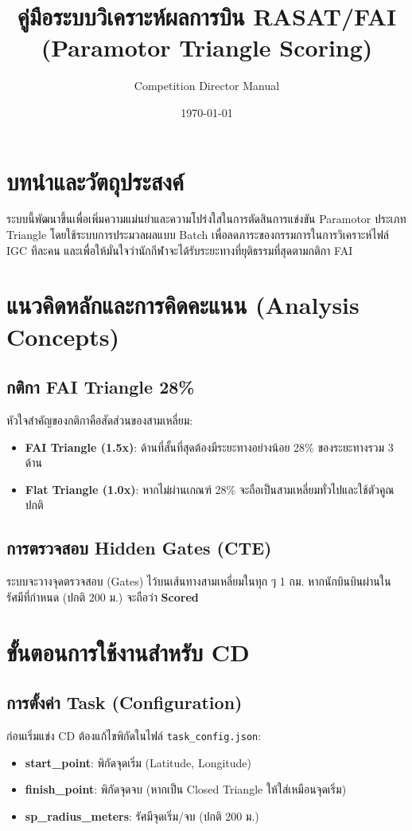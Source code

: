 \documentclass[14pt, a4paper]{extarticle} %
\title{\textbf{คู่มือระบบวิเคราะห์ผลการบิน RASAT/FAI \\ (Paramotor Triangle Scoring)}}
\author{Competition Director Manual}
\date{\today}
\begin{document}
\maketitle
\newpage
\tableofcontents
\newpage

\section{บทนำและวัตถุประสงค์}
ระบบนี้พัฒนาขึ้นเพื่อเพิ่มความแม่นยำและความโปร่งใสในการตัดสินการแข่งขัน Paramotor ประเภท Triangle โดยใช้ระบบการประมวลผลแบบ Batch เพื่อลดภาระของกรรมการในการวิเคราะห์ไฟล์ IGC ทีละคน และเพื่อให้มั่นใจว่านักกีฬาจะได้รับระยะทางที่ยุติธรรมที่สุดตามกติกา FAI

\section{แนวคิดหลักและการคิดคะแนน (Analysis Concepts)}

\subsection{กติกา FAI Triangle 28\%}
หัวใจสำคัญของกติกาคือสัดส่วนของสามเหลี่ยม:
\begin{itemize}
    \item \textbf{FAI Triangle (1.5x)}: ด้านที่สั้นที่สุดต้องมีระยะทางอย่างน้อย 28\% ของระยะทางรวม 3 ด้าน
    \item \textbf{Flat Triangle (1.0x)}: หากไม่ผ่านเกณฑ์ 28\% จะถือเป็นสามเหลี่ยมทั่วไปและใช้ตัวคูณปกติ
\end{itemize}



\subsection{การตรวจสอบ Hidden Gates (CTE)}
ระบบจะวางจุดตรวจสอบ (Gates) ไว้บนเส้นทางสามเหลี่ยมในทุก ๆ 1 กม. หากนักบินบินผ่านในรัศมีที่กำหนด (ปกติ 200 ม.) จะถือว่า \textbf{Scored}

\section{ขั้นตอนการใช้งานสำหรับ CD}

\subsection{การตั้งค่า Task (Configuration)}
ก่อนเริ่มแข่ง CD ต้องแก้ไขพิกัดในไฟล์ \texttt{task\_config.json}:
\begin{itemize}
    \item \textbf{start\_point}: พิกัดจุดเริ่ม (Latitude, Longitude)
    \item \textbf{finish\_point}: พิกัดจุดจบ (หากเป็น Closed Triangle ให้ใส่เหมือนจุดเริ่ม)
    \item \textbf{sp\_radius\_meters}: รัศมีจุดเริ่ม/จบ (ปกติ 200 ม.)
\end{itemize}
\end{document}
